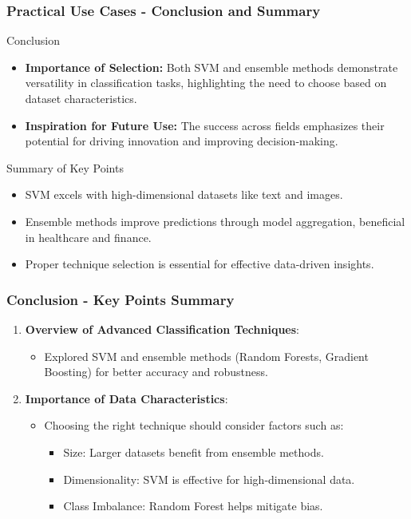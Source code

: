 \documentclass[aspectratio=169]{beamer}
\begin{document}
\begin{frame}[fragile]
    \frametitle{Practical Use Cases - Conclusion and Summary}
    \begin{block}{Conclusion}
        \begin{itemize}
            \item \textbf{Importance of Selection:} 
                Both SVM and ensemble methods demonstrate versatility in classification tasks, highlighting the need to choose based on dataset characteristics.
            \item \textbf{Inspiration for Future Use:} 
                The success across fields emphasizes their potential for driving innovation and improving decision-making.
        \end{itemize}
    \end{block}
    
    \begin{block}{Summary of Key Points}
        \begin{itemize}
            \item SVM excels with high-dimensional datasets like text and images.
            \item Ensemble methods improve predictions through model aggregation, beneficial in healthcare and finance.
            \item Proper technique selection is essential for effective data-driven insights.
        \end{itemize}
    \end{block}
\end{frame}

\begin{frame}[fragile]
    \frametitle{Conclusion - Key Points Summary}
    \begin{enumerate}
        \item \textbf{Overview of Advanced Classification Techniques}:
            \begin{itemize}
                \item Explored SVM and ensemble methods (Random Forests, Gradient Boosting) for better accuracy and robustness.
            \end{itemize}

        \item \textbf{Importance of Data Characteristics}:
            \begin{itemize}
                \item Choosing the right technique should consider factors such as:
                \begin{itemize}
                    \item Size: Larger datasets benefit from ensemble methods.
                    \item Dimensionality: SVM is effective for high-dimensional data.
                    \item Class Imbalance: Random Forest helps mitigate bias.
                \end{itemize}
            \end{itemize}
    \end{enumerate}
\end{frame}
\end{document}
